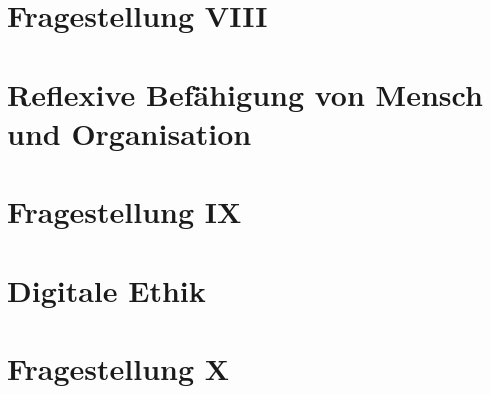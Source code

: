 \documentclass[journal]{IEEEtran}
\begin{document}
\begin{onecolumn}
\section*{Fragestellung VIII}

\newpage

\section{Reflexive Befähigung von Mensch und Organisation}

\section*{Fragestellung IX}

\section{Digitale Ethik}

\section*{Fragestellung X}

\end{onecolumn}
\end{document}
